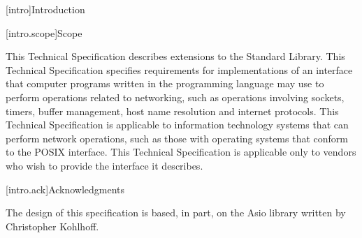 
[intro]{Introduction}

[intro.scope]{Scope}

\pnum
 This Technical Specification describes extensions to the \Cpp Standard Library. This Technical Specification specifies requirements for implementations of an interface that computer programs written in the \Cpp programming language may use to perform operations related to networking, such as operations involving sockets, timers, buffer management, host name resolution and internet protocols. This Technical Specification is applicable to information technology systems that can perform network operations, such as those with operating systems that conform to the POSIX interface. This Technical Specification is applicable only to vendors who wish to provide the interface it describes.


[intro.ack]{Acknowledgments}

\pnum
The design of this specification is based, in part, on the Asio library
written by Christopher Kohlhoff.


